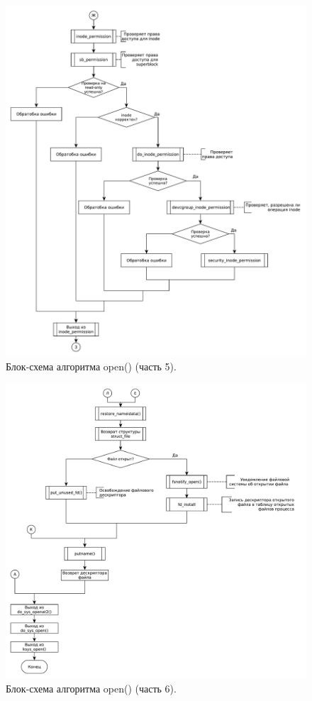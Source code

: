 \begin{figure}[H]
    \centering
    \includegraphics[scale=0.55]{data/newpdg/permissions.pdf}
    \caption{Блок-схема алгоритма open() (часть 5).}
\end{figure}

\begin{figure}[H]
    \centering
    \includegraphics[scale=0.55]{data/newpdg/open_05.pdf}
    \caption{Блок-схема алгоритма open() (часть 6).}
\end{figure}
